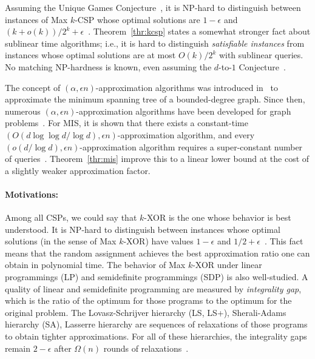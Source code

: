 \documentclass[letterpaper,11pt]{article}
\newcommand{\mis}{\textsf{MIS}\xspace}
\newcommand{\xor}{\textsf{XOR}\xspace}
\newcommand{\maxkcsp}{\textsf{Max $k$-CSP}\xspace}
\newcommand{\maxkxor}{\textsf{Max $k$-XOR}\xspace}
\begin{document}
Assuming the Unique Games Conjecture~\cite{Kho02}, 
it is NP-hard to distinguish between instances of \maxkcsp whose optimal solutions are $1-\epsilon$ and $(k+o(k))/2^k+\epsilon$~\cite{AM08,ST06}.
Theorem~\ref{thr:kcsp} states a somewhat stronger fact about sublinear time algorithms; i.e., 
it is hard to distinguish \textit{satisfiable instances} from instances whose optimal solutions are at most $O(k)/2^k$ with sublinear queries.
No matching NP-hardness is known,
even assuming the $d$-to-$1$ Conjecture~\cite{Kho02}.

The concept of $(\alpha,\epsilon n)$-approximation algorithms was introduced in~\cite{CRT01} to approximate the minimum spanning tree of a bounded-degree graph.
Since then, 
numerous $(\alpha,\epsilon n)$-approximation algorithms have been developed for graph problems~\cite{Alo10,CRT01,MR09,NO08,PR07,YYI09}.
For \mis, it is shown that there exists a constant-time $\left(O(d \log \log d/\log d),\epsilon n\right)$-approximation algorithm,
and every $\left(o(d/\log d),\epsilon n\right)$-approximation algorithm requires a super-constant number of queries~\cite{Alo10}.
Theorem~\ref{thr:mis} improve this to a linear lower bound at the cost of a slightly weaker approximation factor.

\paragraph{Motivations:}
Among all CSPs, 
we could say that $k$-\xor is the one whose behavior is best understood.
It is NP-hard to distinguish between instances whose optimal solutions (in the sense of \maxkxor) have values $1-\epsilon$ and $1/2+\epsilon$~\cite{Has01}.
This fact means that the random assignment achieves the best approximation ratio one can obtain in polynomial time.
The behavior of \maxkxor under linear programmings (LP) and semidefinite programmings (SDP) is also well-studied.
A quality of linear and semidefinite programming are measured by \textit{integrality gap},
which is the ratio of the optimum for those programs to the optimum for the original problem.
The Lovasz-Schrijver hierarchy (LS, LS+), Sherali-Adams hierarchy (SA), Lasserre hierarchy are sequences of relaxations of those programs to obtain tighter approximations.
For all of these hierarchies, the integrality gaps remain $2-\epsilon$ after $\Omega(n)$ rounds of relaxations~\cite{BOG03,GMT09,Sch08}.
\end{document}
